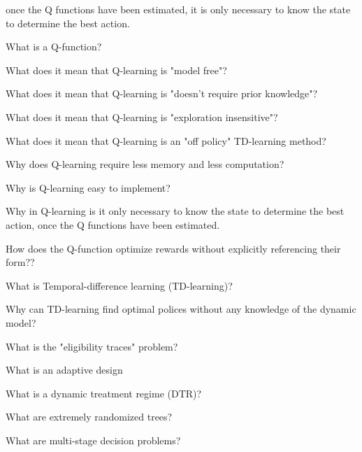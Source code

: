 \documentclass[10pt]{article}
\begin{document}
once the Q functions have been estimated, it is only necessary to know the state to determine the best action.

\hrulefill

What is a Q-function?

\hrulefill

What does it mean that Q-learning is "model free"?

\hrulefill

What does it mean that Q-learning is "doesn't require prior knowledge"?

\hrulefill

What does it mean that Q-learning is "exploration insensitive"?

\hrulefill

What does it mean that Q-learning is an "off policy" TD-learning method?

\hrulefill

Why does Q-learning require less memory and less computation?

\hrulefill

Why is Q-learning easy to implement?

\hrulefill

Why in Q-learning is it only necessary to know the state to determine the best action, once the Q functions have been estimated.

\hrulefill

How does the Q-function optimize rewards without explicitly referencing their form??

\hrulefill

What is Temporal-difference learning (TD-learning)?

\hrulefill

Why can TD-learning find optimal polices without any knowledge of the dynamic model?

\hrulefill

What is the "eligibility traces" problem?

\hrulefill

What is an adaptive design

\hrulefill

What is a dynamic treatment regime (DTR)?

\hrulefill

What are extremely randomized trees?

\hrulefill

What are multi-stage decision problems?

\hrulefill
\end{document}
